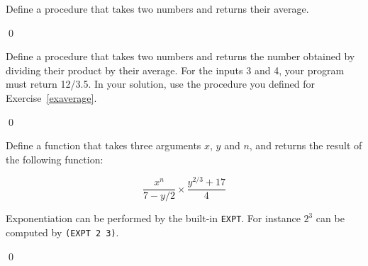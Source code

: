 \documentclass[a4paper,11pt]{article}
\begin{document}
% 
% 
% 


%
%
%

\begin{uexercise}
\label{exaverage}
Define a procedure that takes two numbers and returns their average.

\qed
\end{uexercise}

\begin{uexercise}
Define a procedure that takes two numbers and returns the number
obtained by dividing their product by their average. For the
inputs 3 and 4, your program must return 12/3.5. In your solution, use
the procedure you defined for Exercise~\ref{exaverage}.

\qed
\end{uexercise}

\begin{uexercise}
Define a function that takes three arguments $x$, $y$ and $n$, and returns the result of
the following function: 

$$ \frac{x^n}{7 - y/2} \times \frac{y^{2/3} + 17}{4} $$

Exponentiation can be performed by the built-in \Verb+EXPT+. For instance $2^3$
can be computed by \Verb+(EXPT 2 3)+.

\qed
\end{uexercise}
\end{document}
